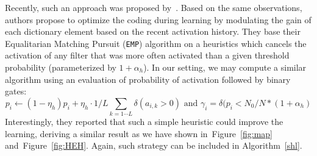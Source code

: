 \documentclass[draft]{article} %
\newcommand{\seeFig}[1]{Figure~\ref{fig:#1}}%
\begin{document}
Recently, such an approach was proposed by~\citet{Sandin17}. Based on the same observations, authors propose to optimize the coding during learning by modulating the gain of each dictionary element based on the recent activation history. They base their Equalitarian Matching Pursuit (\texttt{EMP}) algorithm on a heuristics which cancels the activation of any filter that was more often activated than a given threshold probability (parameterized by $1+\alpha_h$). In our setting, we may compute a similar algorithm using an evaluation of probability of activation followed by binary gates:
\begin{equation}%
p_i \leftarrow (1- \eta_h ) p_i + \eta_h \cdot 1/L\sum_{k=1\cdots L} \delta(a_{i, k} > 0) \textrm{ and }
\gamma_i = \delta (p_i < N_0/N*(1+\alpha_h)
\end{equation}%
Interestingly, they reported that such a simple heuristic could improve the learning, deriving a similar result as we have shown in~\seeFig{map} and~\seeFig{HEH}. %
Again, such strategy can be included in Algorithm~\ref{shl}.
\end{document}
